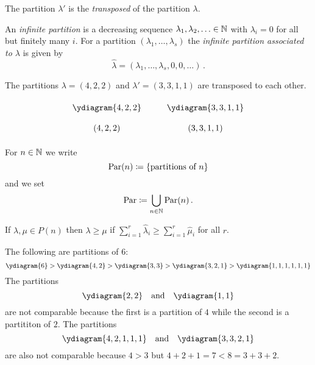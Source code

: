 \begin{definition}
  The partition $\lambda'$ is the \emph{transposed} of the partition $\lambda$.
\end{definition}


\begin{definition}
  An \emph{infinite partition} is a decreasing sequence $\lambda_1, \lambda_2, \dotsc \in \mathbb{N}$ with $\lambda_i = 0$ for all but finitely many $i$.
  For a partition $(\lambda_1, \dotsc, \lambda_s)$ the \emph{infinite partition associated to $\lambda$} is given by
  \[
      \hat{\lambda}
    = (\lambda_1, \dotsc, \lambda_s, 0, 0, \dotsc) \,.
  \]
\end{definition}


\begin{example}
  The partitions $\lambda = (4,2,2)$ and $\lambda' = (3,3,1,1)$ are transposed to each other.
  \[
    \renewcommand{\arraystretch}{2}
    \begin{matrix}
        \ydiagram{4,2,2}
      & \quad
      & \ydiagram{3,3,1,1}
      \\
        (4,2,2)
      & {}
      & (3,3,1,1)
    \end{matrix}
  \]
\end{example}


\begin{definition}
  For $n \in \mathbb{N}$ we write
  \[
              \operatorname{Par}(n)
    \coloneqq  \{\text{partitions of $n$}\}
  \]
  and we set
  \[
              \operatorname{Par}
    \coloneqq  \bigcup_{n \in \mathbb{N}} \operatorname{Par}(n) \,.
  \]
\end{definition}


\begin{definition}
  If $\lambda, \mu \in P(n)$ then $\lambda \geq \mu$ if $\sum_{i=1}^r \hat{\lambda}_i \geq \sum_{i=1}^r \hat{\mu}_i$ for all $r$.
\end{definition}


\begin{example}
  The following are partitions of $6$:
  \[
      \ydiagram{6}
    > \ydiagram{4,2}
    > \ydiagram{3,3}
    > \ydiagram{3,2,1}
    > \ydiagram{1,1,1,1,1,1}
  \]
  The partitions
  \[
    \ydiagram{2,2}
    \quad\text{and}\quad
    \ydiagram{1,1}
  \]
  are not comparable because the first is a partition of $4$ while the second is a partititon of $2$.
  The partitions
  \[
    \ydiagram{4,2,1,1,1}
    \quad \text{and} \quad
    \ydiagram{3,3,2,1}
  \]
  are also not comparable because $4 > 3$ but $4+2+1 = 7 < 8 = 3+3+2$.
\end{example}


